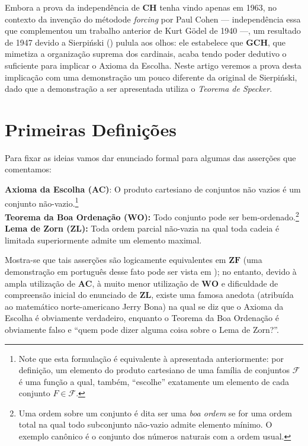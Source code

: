 \documentclass{hipatia}
\newcommand{\ch}{\mathbf{CH}}
\newcommand{\wo}{\mathbf{WO}}
\newcommand{\gch}{\mathbf{GCH}}
\newcommand{\ac}{\mathbf{AC}}
\newcommand{\zf}{\mathbf{ZF}}
\newcommand{\zl}{\mathbf{ZL}}
\begin{document}
Embora a prova da independência de $\ch$ tenha vindo apenas
em 1963, no contexto da invenção do método\linebreak de {\it forcing}
por Paul Cohen --- independência essa que complementou um
trabalho anterior de Kurt Gödel de 1940 ---, um resultado de
1947 devido a Sierpi\'nski (\cite{Sierp}) pulula aos olhos:
ele estabelece que $\gch$, que mimetiza a organização
suprema dos cardinais, acaba tendo poder dedutivo o
suficiente para implicar o Axioma da Escolha. Neste artigo
veremos a prova desta implicação com uma demonstração um
pouco diferente da original de Sierpi\'nski, dado que a
demonstração a ser apresentada utiliza o {\it Teorema de
Specker}.



\section{Primeiras Definições}

Para fixar as ideias vamos dar enunciado formal para algumas
das asserções que comentamos:

{\bf Axioma da Escolha (AC)}: O produto cartesiano de
conjuntos não vazios é um conjunto não-vazio.\footnote{Note que esta formulação é equivalente à apresentada anteriormente: por definição, um elemento do produto cartesiano de uma família de conjuntos $\mathcal{F}$ é uma função a qual, também, ``escolhe'' exatamente um elemento de cada conjunto $F \in \mathcal{F}$.}\\
\textbf{Teorema da Boa Ordenação (WO):} Todo conjunto pode
ser 
bem-ordenado.\footnote{Uma ordem sobre um conjunto é dita ser uma \textit{boa ordem} se for uma ordem total na qual todo subconjunto não-vazio admite elemento mínimo. O exemplo canônico é o conjunto dos números naturais com a ordem usual.}\\ \textbf{Lema de Zorn (ZL):} Toda ordem
parcial não-vazia na qual toda cadeia é limitada
superiormente admite um elemento maximal.

Mostra-se que tais asserções são logicamente equivalentes em
$\zf$ (uma demonstração em português desse fato pode ser
vista em \cite{deJesusdaSilva}); no entanto, devido à ampla
utilização de $\ac$, à muito menor utilização de $\wo$ e
dificuldade de compreensão inicial do enunciado de $\zl$,
existe uma famosa anedota (atribuída ao matemático
norte-americano Jerry Bona) na qual se diz que o Axioma da
Escolha é obviamente verdadeiro, enquanto o Teorema da Boa
Ordenação é obviamente falso e ``quem pode dizer alguma
coisa sobre o Lema de Zorn?''.
\end{document}
